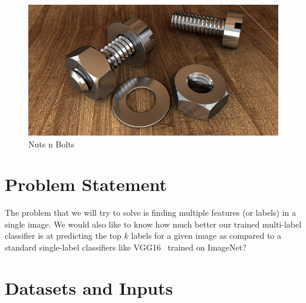\documentclass[10pt, a4paper, twocolumn]{article} %
\begin{document}
\begin{figure}
	\includegraphics[width=\linewidth]{screw-1924174_640.jpg} %
	\caption{Nuts n Bolts} %
	\label{screw-1924174_640} %
\end{figure}

\section{Problem Statement} %


The problem that we will try to solve is finding multiple features (or labels) in a single image. We would also like to know how much better our trained multi-label classifier is at predicting the top $k$ labels for a given image as compared to a standard single-label classifiers like VGG16~\cite{SimonyanZ14a} trained on ImageNet?

\section{Datasets and Inputs}\label{sec:3} %
\end{document}
